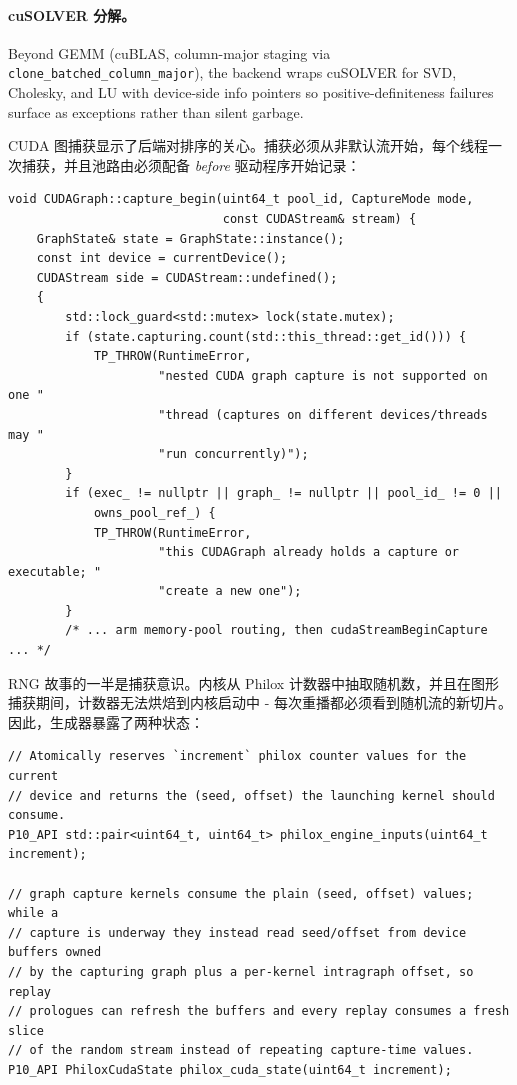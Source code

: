 \paragraph{cuSOLVER 分解。} Beyond GEMM (cuBLAS, column-major staging via \texttt{clone\_batched\_column\_major}), the backend wraps cuSOLVER for SVD, Cholesky, and LU with device-side info pointers so positive-definiteness failures surface as exceptions rather than silent garbage.

CUDA 图捕获显示了后端对排序的关心。捕获必须从非默认流开始，每个线程一次捕获，并且池路由必须配备 \emph{before} 驱动程序开始记录：

\begin{lstlisting}[caption={CUDA-graph capture entry: nesting and reuse are rejected loudly, and the side stream is chosen before any driver call.}, label=lst:cudagraph]
void CUDAGraph::capture_begin(uint64_t pool_id, CaptureMode mode,
                              const CUDAStream& stream) {
    GraphState& state = GraphState::instance();
    const int device = currentDevice();
    CUDAStream side = CUDAStream::undefined();
    {
        std::lock_guard<std::mutex> lock(state.mutex);
        if (state.capturing.count(std::this_thread::get_id())) {
            TP_THROW(RuntimeError,
                     "nested CUDA graph capture is not supported on one "
                     "thread (captures on different devices/threads may "
                     "run concurrently)");
        }
        if (exec_ != nullptr || graph_ != nullptr || pool_id_ != 0 ||
            owns_pool_ref_) {
            TP_THROW(RuntimeError,
                     "this CUDAGraph already holds a capture or executable; "
                     "create a new one");
        }
        /* ... arm memory-pool routing, then cudaStreamBeginCapture ... */
\end{lstlisting}

RNG 故事的一半是捕获意识。内核从 Philox 计数器中抽取随机数，并且在图形捕获期间，计数器无法烘焙到内核启动中 - 每次重播都必须看到随机流的新切片。因此，生成器暴露了两种状态：

\begin{lstlisting}[caption={Philox counter reservation, in two regimes: eager launches get plain (seed, offset); captured kernels read them from device buffers that a replay prologue refreshes.}, label=lst:philox]
// Atomically reserves `increment` philox counter values for the current
// device and returns the (seed, offset) the launching kernel should consume.
P10_API std::pair<uint64_t, uint64_t> philox_engine_inputs(uint64_t increment);

// graph capture kernels consume the plain (seed, offset) values; while a
// capture is underway they instead read seed/offset from device buffers owned
// by the capturing graph plus a per-kernel intragraph offset, so replay
// prologues can refresh the buffers and every replay consumes a fresh slice
// of the random stream instead of repeating capture-time values.
P10_API PhiloxCudaState philox_cuda_state(uint64_t increment);
\end{lstlisting}

